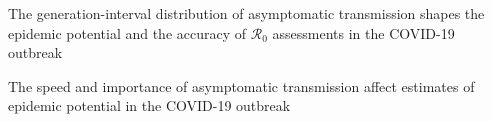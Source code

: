 The generation-interval distribution of asymptomatic transmission shapes the epidemic potential and the accuracy of $\mathcal R_0$ assessments in the COVID-19 outbreak

The speed and importance of asymptomatic transmission affect estimates of epidemic potential in the COVID-19 outbreak
